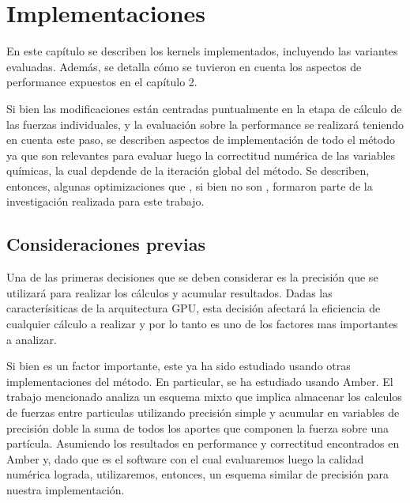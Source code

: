 \chapter{Implementaciones}

En este capítulo se describen los kernels implementados, incluyendo las variantes evaluadas. Además, se detalla cómo se tuvieron en cuenta los aspectos de performance expuestos en el capítulo 2.

Si bien las modificaciones están centradas puntualmente en la etapa de cálculo de las fuerzas individuales, y la evaluación sobre la performance se realizará teniendo en cuenta este paso, 
se describen aspectos de implementación de todo el método ya que son relevantes para evaluar luego la correctitud numérica de las variables químicas, la cual depdende de la iteración global del método.
Se describen, entonces, algunas optimizaciones que , si bien no son , formaron parte de la investigación realizada para este trabajo.


\section{Consideraciones previas}

Una de las primeras decisiones que se deben considerar es la precisión que se utilizará para realizar los cálculos y acumular resultados. Dadas las caracterísiticas de la arquitectura GPU, esta decisión afectará la eficiencia de cualquier cálculo a realizar y por lo tanto es uno de los factores mas importantes a analizar.

Si bien es un factor importante, este ya ha sido estudiado usando otras implementaciones del método.  En particular, se ha estudiado usando Amber\cite{le2013spfp}. El trabajo mencionado analiza un esquema mixto que implica almacenar los calculos de fuerzas entre particulas utilizando precisión simple y acumular en variables de precisión doble la suma de todos los aportes que componen la fuerza sobre una partícula. Asumiendo los resultados en performance y correctitud encontrados en Amber y,
dado que es el software con el cual evaluaremos luego la calidad numérica lograda, utilizaremos, entonces, un esquema similar de precisión para nuestra implementación.


